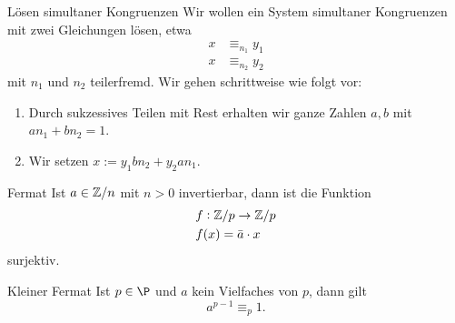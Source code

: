 \begin{howto}{Lösen simultaner Kongruenzen}
    Wir wollen ein System simultaner Kongruenzen mit zwei Gleichungen lösen, etwa
    \begin{align*}
        x&\equiv_{n_1} y_1\\
        x&\equiv_{n_2} y_2
    \end{align*}
    mit $n_1$ und $n_2$ teilerfremd. Wir gehen schrittweise wie folgt vor:
    \begin{enumerate}
        \item Durch sukzessives Teilen mit Rest erhalten wir ganze Zahlen $a,b$ mit $an_1+bn_2=1$.
        \item Wir setzen $x:=y_1bn_2+y_2an_1$.
    \end{enumerate}
\end{howto}

\begin{lemma}{Fermat}
    Ist $a\in\mathbb{Z}/n$ mit $n>0$ invertierbar, dann ist die Funktion
    \begin{align*}
        f&:\mathbb{Z}/p\to\mathbb{Z}/p\\
        f&(x)=\bar a\cdot x
    \end{align*}
    surjektiv.
\end{lemma}

\begin{lemma}{Kleiner Fermat}
    Ist $p\in\P$ und $a$ kein Vielfaches von $p$, dann gilt
    \[
        a^{p-1}\equiv_p1.
    \]
\end{lemma}
